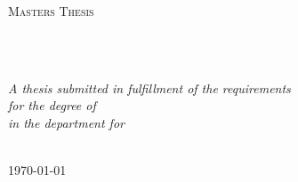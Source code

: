\documentclass[
11pt, %
english, %
singlespacing, %
headsepline, %
]{MastersDoctoralThesis} %
\author{Alex Tripsas} %
\begin{document}
\frontmatter %

\pagestyle{plain} %


\begin{titlepage}
\begin{center}

\vspace*{.06\textheight}
{\scshape\LARGE \univname\par}\vspace{1.5cm} %
\textsc{\Large Masters Thesis}\\[0.5cm] %

\HRule \\[0.4cm] %
{\huge \bfseries \ttitle\par}\vspace{0.4cm} %
\HRule \\[1.5cm] %
 

 
\vfill

\large \textit{A thesis submitted in fulfillment of the requirements\\ for the degree of \degreename}\\[0.3cm] %
\textit{in the department for}\\[0.4cm]
\deptname\\[2cm] %
 
\vfill

{\large \today}\\[4cm] %
 
\vfill
\end{center}
\end{titlepage}
\end{document}
